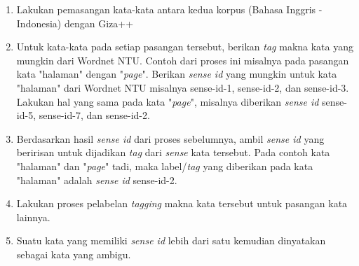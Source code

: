 	\begin{enumerate}
		\item Lakukan pemasangan kata-kata antara kedua korpus (Bahasa Inggris - Indonesia) dengan Giza++
		\item Untuk kata-kata pada setiap pasangan tersebut, berikan \textit{tag} makna kata yang mungkin dari Wordnet NTU. Contoh dari proses ini misalnya pada pasangan kata "halaman" dengan "\textit{page}". Berikan \textit{sense id} yang mungkin untuk kata "halaman" dari Wordnet NTU misalnya sense-id-1, sense-id-2, dan sense-id-3. Lakukan hal yang sama pada kata "\textit{page}", misalnya diberikan \textit{sense id} sense-id-5, sense-id-7, dan sense-id-2.
		\item Berdasarkan hasil \textit{sense id} dari proses sebelumnya, ambil \textit{sense id} yang beririsan untuk dijadikan \textit{tag} dari \textit{sense} kata tersebut. Pada contoh kata "halaman" dan "\textit{page}" tadi, maka label/\textit{tag} yang diberikan pada kata "halaman" adalah \textit{sense id} sense-id-2.
		\item Lakukan proses pelabelan \textit{tagging} makna kata tersebut untuk pasangan kata lainnya.
		\item Suatu kata yang memiliki \textit{sense id} lebih dari satu kemudian dinyatakan sebagai kata yang ambigu.
	\end{enumerate}


